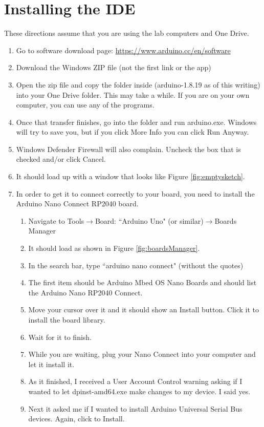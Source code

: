\section{Installing the IDE}
These directions assume that you are using the lab computers and One Drive.
\begin{enumerate}
	\item Go to software download page: \href{https://www.arduino.cc/en/software}{https://www.arduino.cc/en/software}
	\item Download the Windows ZIP file (not the first link or the app)
	\item Open the zip file and copy the folder inside (arduino-1.8.19 as of this writing) into your One Drive folder. This may take a while. If you are on your own computer, you can use any of the programs.
	\item Once that transfer finishes, go into the folder and run arduino.exe. Windows will try to save you, but if you click More Info you can click Run Anyway.
	\item Windows Defender Firewall will also complain. Uncheck the box that is checked and/or click Cancel.
	\item It should load up with a window that looks like Figure \ref{fig:emptysketch}.
	\item In order to get it to connect correctly to your board, you need to install the Arduino Nano Connect RP2040 board.
	\begin{enumerate}
		\item Navigate to Tools$\rightarrow$Board: ``Arduino Uno" (or similar)$\rightarrow$Boards Manager
		\item It should load as shown in Figure \ref{fig:boardsManager}.
		\item In the search bar, type ``arduino nano connect" (without the quotes)
		\item The first item should be Arduino Mbed OS Nano Boards and should list the Arduino Nano RP2040 Connect.
		\item Move your cursor over it and it should show an Install button. Click it to install the board library.
		\item Wait for it to finish.
		\item While you are waiting, plug your Nano Connect into your computer and let it install it.
		\item As it finished, I received a User Account Control warning asking if I wanted to let dpinst-amd64.exe make changes to my device. I said yes.
		\item Next it asked me if I wanted to install Arduino Universal Serial Bus devices. Again, click to Install.

\end{enumerate}
\end{enumerate}
